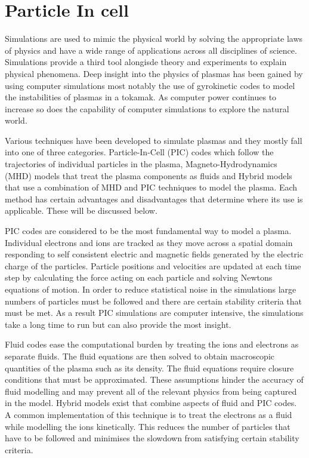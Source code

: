 

\chapter{Particle In cell} %
\label{Chapter3}

Simulations are used to mimic the physical world by solving the appropriate laws of physics and have a wide range of applications across all disciplines of science. Simulations provide a third tool alongisde theory and experiments to explain physical phenomena. Deep insight into the physics of plasmas has been gained by using computer simulations most notably the use of gyrokinetic codes to model the instabilities of plasmas in a tokamak. As computer power continues to increase so does the capability of computer simulations to explore the natural world.

Various techniques have been developed to simulate plasmas and they mostly fall into one of three categories. Particle-In-Cell (PIC) codes which follow the trajectories of individual particles in the plasma, Magneto-Hydrodynamics (MHD) models that treat the plasma components as fluids and Hybrid models that use a combination of MHD and PIC techniques to model the plasma. Each method has certain advantages and disadvantages that determine where its use is applicable. These will be discussed below.

PIC codes are considered to be the most fundamental way to model a plasma. Individual electrons and ions are tracked as they move across a spatial domain responding to self consistent electric and magnetic fields generated by the electric charge of the particles. Particle positions and velocities are updated at each time step by calculating the force acting on each particle and solving Newtons equations of motion. In order to reduce statistical noise in the simulations large numbers of particles must be followed and there are certain stability criteria that must be met. As a result PIC simulations are computer intensive, the simulations take a long time to run but can also provide the most insight.

Fluid codes ease the computational burden by treating the ions and electrons as separate fluids. The fluid equations are then solved to obtain macroscopic quantities of the plasma such as its density. The fluid equations require closure conditions that must be approximated. These assumptions hinder the accuracy of fluid modelling and may prevent all of the relevant physics from being captured in the model. Hybrid models exist that combine aspects of fluid and PIC codes. A common implementation of this technique is to treat the electrons as a fluid while modelling the ions kinetically. This reduces the number of particles that have to be followed and minimises the slowdown from satisfying certain stability criteria.



